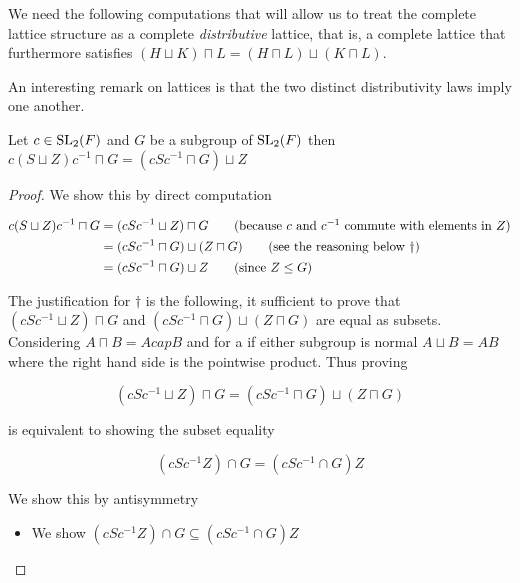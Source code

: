 \begin{footnotesize}


We need the following computations that will allow us to treat the complete lattice structure as a complete \textit{distributive} lattice, that is, a complete lattice that
furthermore satisfies $(H \sqcup K) \sqcap L = (H \sqcap L) \sqcup (K \sqcap L)$. 

An interesting remark on lattices is that the two distinct distributivity laws imply one another.


\begin{lemma}
  \label{MaximalAbelianSubgroup.conj_S_join_Z_meet_G_eq_conj_S_meet_G_join_Z}
  \leanok
  Let $c \in \operatorname{SL}_2(F)$  and $G$ be a subgroup of $\operatorname{SL}_2(F)$ then $c(S \sqcup Z)c^{-1} \sqcap G = (cSc^{-1} \sqcap G) \sqcup Z$
\end{lemma}
\begin{proof}
  \leanok
We show this by direct computation

\begin{align*}
  c(S \sqcup Z)c^{-1} \sqcap G &= (cSc^{-1} \sqcup Z) \sqcap G \tag{because $c$ and $c^{-1}$ commute with elements in $Z$}\\
   &= (cSc^{-1} \sqcap G) \sqcup (Z \sqcap G) \tag{see the reasoning below $\dagger$}\\
   &= (cSc^{-1} \sqcap G) \sqcup Z \tag{since $Z \le G$}
\end{align*}

The justification for $\dagger$ is the following, it sufficient to prove that $(cSc^{-1} \sqcup Z) \sqcap G$
and $(cSc^{-1} \sqcap G) \sqcup (Z \sqcap G)$ are equal as subsets. Considering $A \sqcap B = A cap B$ and for a if either subgroup is normal
$A \sqcup B = AB$ where the right hand side is the pointwise product. Thus proving

\[
  (cSc^{-1} \sqcup Z) \sqcap G = (cSc^{-1} \sqcap G) \sqcup (Z \sqcap G)
\]

is equivalent to showing the subset equality 

\[
(cSc^{-1}Z) \cap G = (cSc^{-1} \cap G)Z
\]

We show this by antisymmetry

\begin{itemize}
  \item We show $(cSc^{-1}Z) \cap G \subseteq (cSc^{-1} \cap G)Z$
  

\end{itemize}
\end{proof}
\end{footnotesize}
